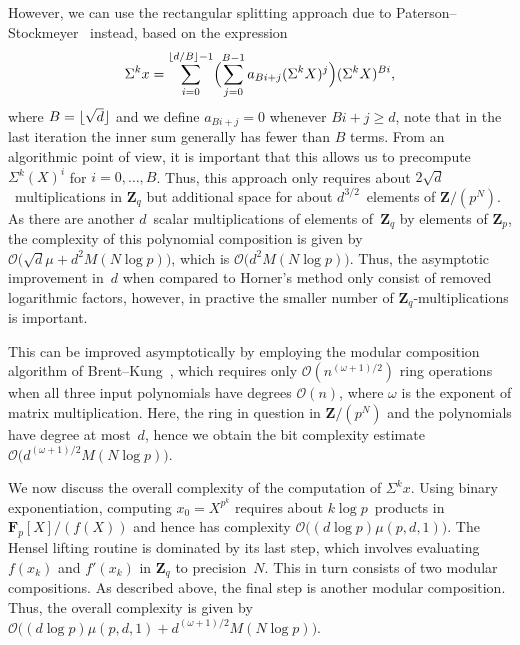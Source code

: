 However, we can use the rectangular splitting approach due to 
Paterson--Stockmeyer~\citep{PatersonStockmeyer1973} instead, based 
on the expression 
\begin{equation}
\Sigma^k x = \sum_{i=0}^{\left\lfloor d/B\right\rfloor-1} \Bigl( \sum_{j=0}^{B-1} a_{Bi + j} (\Sigma^k X)^j  \Bigr) (\Sigma ^k X)^{Bi},
\end{equation}
where $B = \lfloor\sqrt{d}\rfloor$ and we define $a_{Bi + j} = 0$ whenever 
$Bi + j \geq d$, note that in the last iteration the inner sum generally 
has fewer than $B$ terms.  From an algorithmic point of view, it is 
important that this allows us to precompute $\Sigma^k(X)^i$ for 
$i = 0, \dotsc, B$.  Thus, this approach only requires about 
\mbox{$2 \sqrt{d}$}~multiplications in $\mathbf{Z}_q$ but additional space 
for about $d^{3/2}$~elements of $\mathbf{Z}/(p^N)$.  As there are another 
$d$~scalar multiplications of elements of~$\mathbf{Z}_q$ by elements of 
$\mathbf{Z}_p$, the complexity of this polynomial composition 
is given by $\mathcal{O}\bigl(\sqrt{d} \mu + d^2 M(N \log p)\bigr)$, which 
is $\mathcal{O}\bigl(d^2 M(N \log p)\bigr)$.  Thus, the asymptotic 
improvement in~$d$ when compared to Horner's method 
only consist of removed logarithmic factors, however, in practive the smaller 
number of $\mathbf{Z}_q$-multiplications is important.

This can be improved asymptotically by employing the modular composition 
algorithm of Brent--Kung~\citep{BrentKung1978}, which requires only 
$\mathcal{O}(n^{(\omega+1)/2})$ ring operations when all three input 
polynomials have degrees $\mathcal{O}(n)$, where $\omega$ is the exponent 
of matrix multiplication.  Here, the ring in question in $\mathbf{Z}/(p^N)$ 
and the polynomials have degree at most~$d$, hence we obtain the bit 
complexity estimate $\mathcal{O}(d^{(\omega + 1)/2} M(N \log p)\bigr)$.

We now discuss the overall complexity of the computation of $\Sigma^k x$.
Using binary exponentiation, computing \mbox{$x_0 = X^{p^k}$} 
requires about $k \log p$~products in~$\mathbf{F}_p[X] / (f(X))$ and hence 
has complexity $\mathcal{O}\bigl((d \log p) \mu(p,d,1)\bigr)$.  The Hensel 
lifting routine is dominated by its last step, which involves evaluating 
$f(x_k)$ and $f'(x_k)$ in $\mathbf{Z}_q$ to precision~$N$.  This in turn 
consists of two modular compositions.  As described above, the final step 
is another modular composition.  Thus, the overall complexity is given by 
$\mathcal{O}\bigl( (d \log p) \mu(p,d,1) 
+ d^{(\omega + 1)/2} M(N \log p) \bigr)$.

